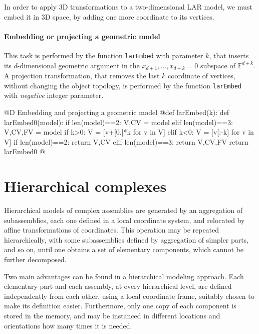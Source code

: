 \documentclass[11pt,oneside]{article}    %
\def\E{\mathbb{E}}
\begin{document}
In order to apply 3D transformations to a two-dimensional LAR model, we must embed it in 3D space, by adding one more coordinate to its vertices. 

\paragraph{Embedding or projecting a geometric model}

This task is performed by the function \texttt{larEmbed} with parameter $k$, that inserts its $d$-dimensional geometric argument in the $x_{d+1}, \ldots, x_{d+k}=0$ subspace of $\E^{d+k}$.
A projection transformation, that removes the last $k$ coordinate of vertices, without changing the object topology, is performed by the function \texttt{larEmbed} with \emph{negative} integer parameter.


@D Embedding and projecting a geometric model
@{def larEmbed(k):
    def larEmbed0(model):
        if len(model)==2: V,CV = model
        elif len(model)==3: V,CV,FV = model
        if k>0:
            V = [v+[0.]*k for v in V] 
        elif k<0:
            V = [v[:-k] for v in V] 
        if len(model)==2: return V,CV
        elif len(model)==3: return V,CV,FV
    return larEmbed0
@}

\section{Hierarchical complexes}
Hierarchical models of complex assemblies are generated by an aggregation
of subassemblies, each one defined in a local coordinate system, and
relocated by affine transformations of coordinates.  This operation
may be repeated hierarchically, with some subassemblies defined by
aggregation of simpler parts, and so on, until one obtains a set of
elementary components, which cannot be further decomposed.

Two main advantages can be found in a hierarchical modeling approach. Each elementary part and each assembly, at every hierarchical level, are defined independently from each other, using a local coordinate frame, suitably chosen to make its definition easier. Furthermore, only one copy of each component is stored in the memory, and may be instanced in different locations and orientations how many times it is needed.
\end{document}
